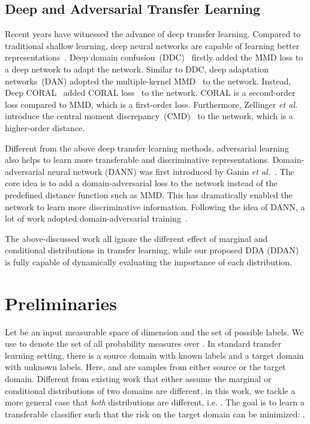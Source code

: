 \documentclass[acmsmall]{acmart}
\begin{document}
\subsection{Deep and Adversarial Transfer Learning}

Recent years have witnessed the advance of deep transfer learning. Compared to traditional shallow learning, deep neural networks are capable of learning better representations~\cite{yosinski2014transferable}. Deep domain confusion~(DDC)~\cite{tzeng2014deep} firstly added the MMD loss to a deep network to adapt the network. Similar to DDC, deep adaptation networks~(DAN) adopted the multiple-kernel MMD~\cite{gretton2012optimal} to the network. Instead, Deep CORAL~\cite{sun2016deep} added CORAL loss~\cite{sun2016return} to the network. CORAL is a second-order loss compared to MMD, which is a first-order loss. Furthermore, Zellinger \textit{et al.} introduce the central moment discrepancy~(CMD)~\cite{zellinger2017central} to the network, which is a higher-order distance. 

Different from the above deep transfer learning methods, adversarial learning~\cite{goodfellow2014generative} also helps to learn more transferable and discriminative representations. Domain-adversarial neural network (DANN) was first introduced by Ganin \textit{et al.}~\cite{ganin2014unsupervised,ganin2016domain}. The core idea is to add a domain-adversarial loss to the network instead of the predefined distance function such as MMD. This has dramatically enabled the network to learn more discriminative information. Following the idea of DANN, a lot of work adopted domain-adversarial training~\cite{long2017deep,zhang2018collaborative,long2018conditional,bousmalis2016domain,chen2018joint}.

The above-discussed work all ignore the different effect of marginal and conditional distributions in transfer learning, while our proposed DDA (DDAN) is fully capable of dynamically evaluating the importance of each distribution.

\section{Preliminaries}
\label{sec-pre}

Let  be an input measurable space of dimension  and  the set of possible labels. We use  to denote the set of all probability measures over . In standard transfer learning setting, there is a source domain  with known labels  and a target domain  with unknown labels. Here,  and  are samples from either source or the target domain. Different from existing work that either assume the marginal or conditional distributions of two domains are different, in this work, we tackle a more general case that \textit{both} distributions are different, i.e. . The goal is to learn a transferable classifier  such that the risk on the target domain can be minimized: .
\end{document}

